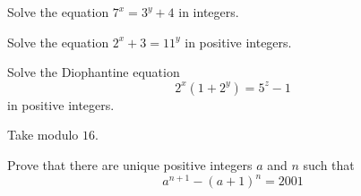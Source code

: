 \documentclass{subfile}
\begin{document}
	\begin{problem} %
		Solve the equation $7^x=3^y+4$ in integers.
	\end{problem}

	\begin{problem} %
		 Solve the equation $2^x+3=11^y$ in positive integers.
	\end{problem}

	\begin{problem} %
		Solve the Diophantine equation $$2^x(1+2^y)=5^z-1$$ in positive integers.
	\end{problem}

	\begin{hint}
		Take modulo $16$.
	\end{hint}

	\begin{problem}[Putnam 2001] %
		Prove that there are unique positive integers $a$ and $n$ such that $$a^{n+1}-(a+1)^n=2001$$
	\end{problem}
\end{document}
